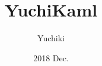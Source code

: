 \usepackage{amsmath,amssymb}
\usepackage{mathtools}

\title{YuchiKaml}
\author{Yuchiki}
\date{2018 Dec.}
